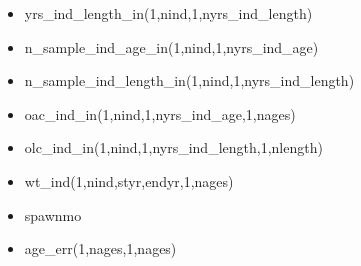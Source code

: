 \documentclass{article}
\begin{document}
\begin{itemize}
    \item yrs\_ind\_length\_in(1,nind,1,nyrs\_ind\_length)
    \item n\_sample\_ind\_age\_in(1,nind,1,nyrs\_ind\_age)
    \item n\_sample\_ind\_length\_in(1,nind,1,nyrs\_ind\_length)
    \item oac\_ind\_in(1,nind,1,nyrs\_ind\_age,1,nages)
    \item olc\_ind\_in(1,nind,1,nyrs\_ind\_length,1,nlength)
    \item wt\_ind(1,nind,styr,endyr,1,nages) 
    \item spawnmo
    \item age\_err(1,nages,1,nages)

 

\end{itemize}

\end{document}
